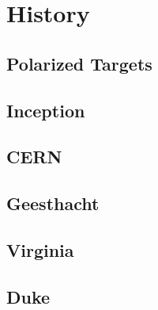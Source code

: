 \chapter{History} 
\label{history} 

\section{Polarized Targets}

\section{Inception}  
 
\section{CERN} 
 
\section{Geesthacht} 

\section{Virginia}

\section{Duke}